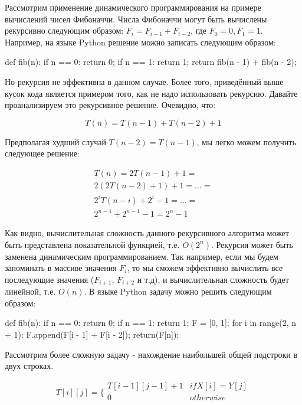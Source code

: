 Рассмотрим применение динамического программирования на примере вычислений чисел Фибоначчи. Числа 
Фибоначчи могут быть вычислены рекурсивно следующим образом: $F_i = F_{i-1} + F_{i-2}$, 
где $F_0=0, F_1=1$. Например, на языке Python решение можно записать следующим образом:

\begin{python}
def fib(n):
	if n == 0:
		return 0;
	if n == 1:
		return 1;
	return fib(n - 1) + fib(n - 2);
\end{python}

Но рекурсия не эффективна в данном случае. Более того, приведённый выше кусок кода 
является примером того, как не надо использовать рекурсию. Давайте проанализируем это 
рекурсивное решение. Очевидно, что:

$$
T(n) = T(n-1) + T(n-2) + 1
$$

Предполагая худший случай $T(n-2)=T(n-1)$, мы легко можем получить следующее решение:

\begin{equation*}
\begin{multlined}
T(n) = 2T(n-1) + 1= \\
	   2(2T(n-2) + 1) + 1 = 
	   \ldots = \\
	   2^{i}T(n-i) + 2^{i} - 1 = 
	   \ldots = \\
	   2^{n-1} + 2^{n-1} - 1 = 
	   2^{n} - 1
\end{multlined}
\end{equation*}

Как видно, вычислительная сложность данного рекурсивного алгоритма 
может быть представлена показательной функцией, т.е. $O(2^n)$. Рекурсия может 
быть заменена динамическим программированием. 
Так например, если мы будем запоминать в массиве значения $F_i$, то мы сможем
эффективно вычислить все последующие значения ($F_{i+1}$, $F_{i+2}$ и т.д), и 
вычислительная сложность будет линейной, т.е. $O(n)$. В языке Python задачу 
можно решить следующим образом:

\begin{python}
def fib(n):
	if n == 0:
		return 0;
	if n == 1:
		return 1;
	F = [0, 1];
	for i in range(2, n + 1):
		F.append(F[i - 1] + F[i - 2]);
	return(F[n]);
\end{python}


Рассмотрим более сложную задачу - нахождение наибольшей общей подстроки в двух строках.

$$
T[i][j] = \Bigg\{
	\begin{array}{cc}
      T[i - 1][j - 1] + 1 & if X[i] = Y[j] \\
      0 & otherwise \\
    \end{array}
$$

